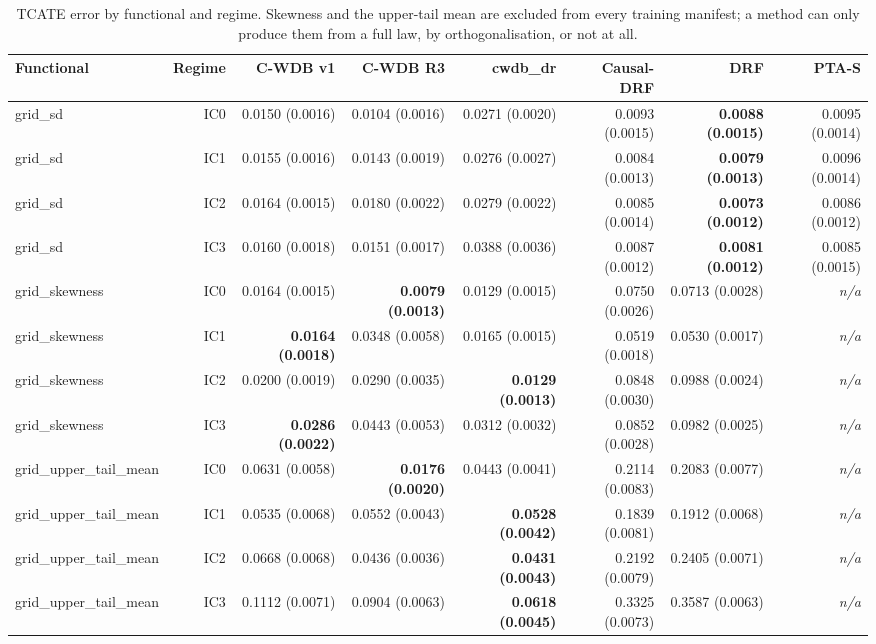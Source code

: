 \begin{table}[htbp]
\centering
\caption{TCATE error by functional and regime. Skewness and the upper-tail mean are excluded from every training manifest; a method can only produce them from a full law, by orthogonalisation, or not at all.}
\label{tab:p6-incomeB-tcate}
\small
\begin{tabular}{@{}lrrrrrrr@{}}
\toprule
Functional & Regime & C-WDB v1 & C-WDB R3 & cwdb\_dr & Causal-DRF & DRF & PTA-S \\ 
\midrule
grid\_sd & IC0 & 0.0150 (0.0016) & 0.0104 (0.0016) & 0.0271 (0.0020) & 0.0093 (0.0015) & \textbf{0.0088 (0.0015)} & 0.0095 (0.0014) \\ 
grid\_sd & IC1 & 0.0155 (0.0016) & 0.0143 (0.0019) & 0.0276 (0.0027) & 0.0084 (0.0013) & \textbf{0.0079 (0.0013)} & 0.0096 (0.0014) \\ 
grid\_sd & IC2 & 0.0164 (0.0015) & 0.0180 (0.0022) & 0.0279 (0.0022) & 0.0085 (0.0014) & \textbf{0.0073 (0.0012)} & 0.0086 (0.0012) \\ 
grid\_sd & IC3 & 0.0160 (0.0018) & 0.0151 (0.0017) & 0.0388 (0.0036) & 0.0087 (0.0012) & \textbf{0.0081 (0.0012)} & 0.0085 (0.0015) \\ 
grid\_skewness & IC0 & 0.0164 (0.0015) & \textbf{0.0079 (0.0013)} & 0.0129 (0.0015) & 0.0750 (0.0026) & 0.0713 (0.0028) & \emph{n/a} \\ 
grid\_skewness & IC1 & \textbf{0.0164 (0.0018)} & 0.0348 (0.0058) & 0.0165 (0.0015) & 0.0519 (0.0018) & 0.0530 (0.0017) & \emph{n/a} \\ 
grid\_skewness & IC2 & 0.0200 (0.0019) & 0.0290 (0.0035) & \textbf{0.0129 (0.0013)} & 0.0848 (0.0030) & 0.0988 (0.0024) & \emph{n/a} \\ 
grid\_skewness & IC3 & \textbf{0.0286 (0.0022)} & 0.0443 (0.0053) & 0.0312 (0.0032) & 0.0852 (0.0028) & 0.0982 (0.0025) & \emph{n/a} \\ 
grid\_upper\_tail\_mean & IC0 & 0.0631 (0.0058) & \textbf{0.0176 (0.0020)} & 0.0443 (0.0041) & 0.2114 (0.0083) & 0.2083 (0.0077) & \emph{n/a} \\ 
grid\_upper\_tail\_mean & IC1 & 0.0535 (0.0068) & 0.0552 (0.0043) & \textbf{0.0528 (0.0042)} & 0.1839 (0.0081) & 0.1912 (0.0068) & \emph{n/a} \\ 
grid\_upper\_tail\_mean & IC2 & 0.0668 (0.0068) & 0.0436 (0.0036) & \textbf{0.0431 (0.0043)} & 0.2192 (0.0079) & 0.2405 (0.0071) & \emph{n/a} \\ 
grid\_upper\_tail\_mean & IC3 & 0.1112 (0.0071) & 0.0904 (0.0063) & \textbf{0.0618 (0.0045)} & 0.3325 (0.0073) & 0.3587 (0.0063) & \emph{n/a} \\ 
\bottomrule
\end{tabular}
\end{table}


